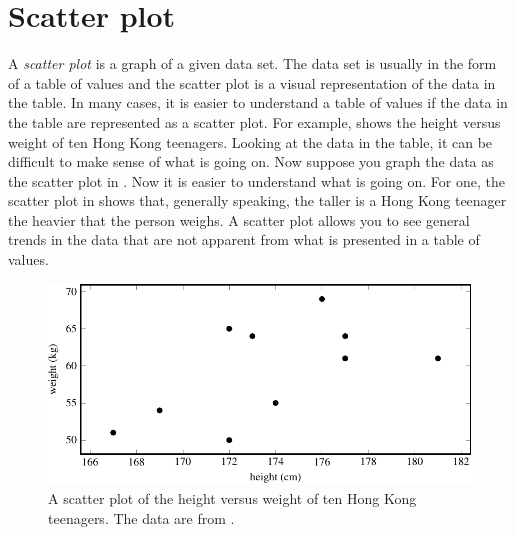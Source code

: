 \documentclass[a4paper,oneside,12pt]{article}
\begin{document}

\section{Scatter plot}

A \emph{scatter plot} is a graph of a given data set.  The data set is
usually in the form of a table of values and the scatter plot is a
visual representation of the data in the table.  In many cases, it is
easier to understand a table of values if the data in the table are
represented as a scatter plot.  For example, 
shows the height versus weight of ten Hong Kong teenagers.  Looking at
the data in the table, it can be difficult to make sense of what is
going on.  Now suppose you graph the data as the scatter plot in
.  Now it is easier to
understand what is going on.  For one, the scatter plot in
 shows that, generally speaking,
the taller is a Hong Kong teenager the heavier that the person
weighs.  A scatter plot allows you to see general trends in the data
that are not apparent from what is presented in a table of values.

\begin{table}[!htbp]
\centering

\caption{%
  The height and weight of ten Hong Kong teenagers.  Height is
  measured in centimetres and weight is measured in kilograms.
}
\label{tab:height_weight}
\end{table}

\begin{figure}[!htbp]
\centering
\includegraphics[scale=1]{image/07/height-weight-scatterplot.pdf}
\caption{%
  A scatter plot of the height versus weight of ten Hong Kong
  teenagers.  The data are from .
}
\label{fig:height_weight_scatterplot}
\end{figure}
\end{document}
